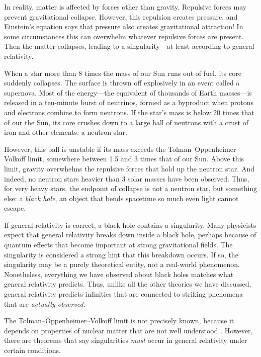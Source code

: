 \documentclass{article}
\begin{document}
In reality, matter is affected by forces other than gravity.  Repulsive forces may prevent gravitational collapse.  However, this repulsion creates pressure, and Einstein's equation says that pressure also creates gravitational attraction!   In some circumstances this can overwhelm whatever repulsive forces are present.  Then the matter collapses, leading to a singularity---at least according to general relativity.

When a star more than 8 times the mass of our Sun runs out of fuel, its core suddenly collapses.  The surface is thrown off explosively in an event called a supernova.   Most of the energy---the equivalent of thousands of Earth masses---is released in a ten-minute burst of neutrinos, formed as a byproduct when protons and electrons combine to form neutrons.  If the star's mass is below 20 times that of our the Sun, its core crushes down to a large ball of neutrons with a crust of iron and other elements: a neutron star.

However, this ball is unstable if its mass exceeds the Tolman--Oppenheimer--Volkoff limit, somewhere between 1.5 and 3 times that of our Sun.   Above this limit, gravity overwhelms the repulsive forces that hold up the neutron star.  And indeed, no neutron stars heavier than 3 solar masses have been observed.   Thus, for very heavy stars, the endpoint of collapse is not a neutron star, but something else: a \emph{black hole}, an object that bends spacetime so much even light cannot escape.

If general relativity is correct, a black hole contains a singularity.  Many physicists expect that general relativity breaks down inside a black hole, perhaps because of quantum effects that become important at strong gravitational fields.  The singularity is considered a strong hint that this breakdown occurs.   If so, the singularity may be a purely theoretical entity, not a real-world phenomenon.  Nonetheless, everything we have observed about black holes matches what general relativity predicts.  Thus, unlike all the other theories we have discussed, general relativity predicts infinities that are connected to striking phenomena that are \emph{actually observed}.

The Tolman--Oppenheimer--Volkoff limit is not precisely known, because it depends on properties of nuclear matter that are not well understood \cite{Bombaci}.  However, there are theorems that say singularities \emph{must} occur in general relativity under certain conditions.  
\end{document}
